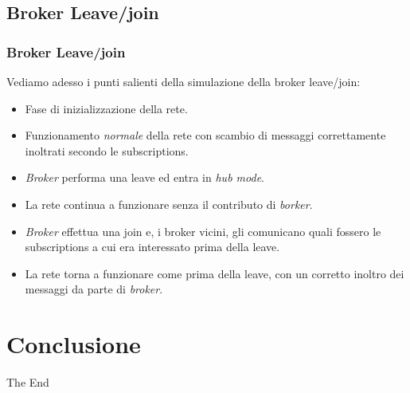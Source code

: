 \documentclass{beamer}
\begin{document}
\begin{frame}

	

\end{frame}

\subsection{Broker Leave/join}

\begin{frame}
	\frametitle{Broker Leave/join}
	
	Vediamo adesso i punti salienti della simulazione della broker leave/join:
	\begin{itemize}
		\item Fase di inizializzazione della rete.
		\item Funzionamento \emph{normale} della rete con scambio di messaggi correttamente inoltrati secondo le subscriptions.
		\item \emph{Broker} performa una leave ed entra in \emph{hub mode}.
		\item La rete continua a funzionare senza il contributo di \emph{borker}.
		\item \emph{Broker} effettua una join e, i broker vicini, gli comunicano quali fossero le subscriptions a cui era interessato prima della leave.
		\item La rete torna a funzionare come prima della leave, con un corretto inoltro dei messaggi da parte di \emph{broker}.
	\end{itemize}
\end{frame}

\begin{frame}
	
	
	
\end{frame}

\section{Conclusione}
\begin{frame}
	\Huge{\centerline{The End}}
\end{frame}

\end{document}
